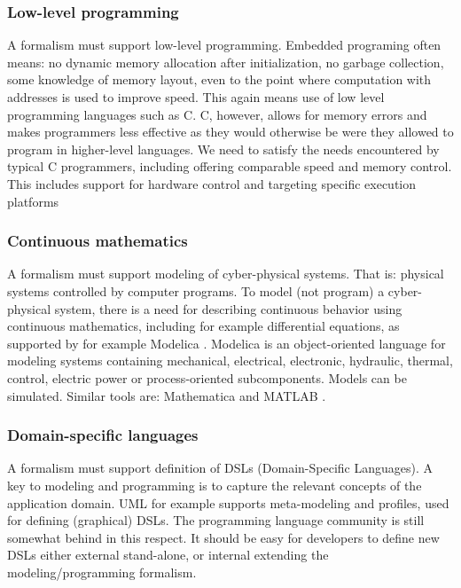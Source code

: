 \subsubsection{Low-level programming}

A formalism must support low-level programming.
Embedded programing often means: no dynamic memory 
allocation after initialization, no garbage collection, some 
knowledge of memory layout, even to the point where computation 
with addresses is used to improve speed. This again means use of 
low level programming languages such as C. C, however, allows for 
memory errors and makes programmers less effective as they would 
otherwise be were they allowed to program in higher-level 
languages. We need to satisfy the needs encountered by typical C 
programmers, including offering comparable speed and memory 
control. This includes support for hardware control and
targeting specific execution platforms 


\subsubsection{Continuous mathematics}

A formalism must support modeling of cyber-physical systems. That
is: physical systems controlled by computer programs. To model (not program) a cyber-physical system, there is a need for describing
continuous behavior using continuous mathematics, including
for example differential equations, as supported by for example
Modelica \cite{?}. Modelica is an object-oriented  
language for modeling systems containing mechanical, electrical, electronic, hydraulic, thermal, control, electric power or process-oriented subcomponents. Models can be simulated.
Similar tools are: Mathematica \cite{?} and
MATLAB \cite{?}.


\subsubsection{Domain-specific languages}

A formalism must support definition of DSLs (Domain-Specific 
Languages). A key to modeling and programming is to capture 
the relevant concepts of the application domain. UML for example
supports meta-modeling and profiles, used for defining (graphical)
DSLs. The programming language community is still somewhat behind
in this respect. It should be easy for developers to define new
DSLs either external stand-alone, or internal extending the
modeling/programming formalism.

